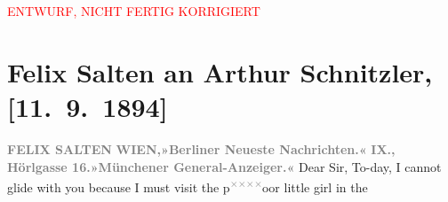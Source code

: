 
\begin{center}
            \textcolor{red}{ENTWURF, NICHT FERTIG KORRIGIERT}
                      \end{center}
            
         
         \renewcommand{\erwaehntePersonen}{Personen: Hermann Bahr, Charlotte Pohl-Glas}
         \renewcommand{\erwaehnteInstitutionen}{Institutionen: Berliner Neueste Nachrichten, Münchener General-Anzeiger}
         \renewcommand{\erwaehnteOrte}{Orte: Hörlgasse, Wien}
         \renewcommand{\erwaehnteWerke}{Werke: Studien zur Kritik der Moderne}
               \section[Felix Salten an Arthur Schnitzler, {[}11. 9. 1894{]}]{ Felix Salten an Arthur Schnitzler, {[}11. 9. 1894{]}}\nopagebreak{}\rehead{ }\begin{ledgroupsized}[t]{13cm}\normalsize\beginnumbering \toendnotes[C]{\smallbreak\pagebreak[2]} 
\toendnotes[C]{\smallbreak}\pstart
           \noindent{}\centering{}{\pb}\textcolor{gray}{\textbf{FELIX SALTEN}}\pend
           \pstart
           \noindent{}\textcolor{gray}{\textbf{WIEN,}}\hfill \textcolor{gray}{\textbf{»Berliner Neueste
                        Nachrichten.«}}\pend
           \pstart
           \textcolor{gray}{\textbf{IX., Hörlgasse 16.}}\hfill \textcolor{gray}{\textbf{»Münchener
                        General-Anzeiger.«}}\pend
           \pstart
           {\pb}Dear Sir,\pend
           \pstart
           To-day, I cannot glide with you because I must visit the p\substVorne{}\textsuperscript{\textcolor{gray}{×}\-\textcolor{gray}{×}\-\textcolor{gray}{×}\-\textcolor{gray}{×}}\substDazwischen{}oor\substHinten{} little girl in the

\end{ledgroupsized}
